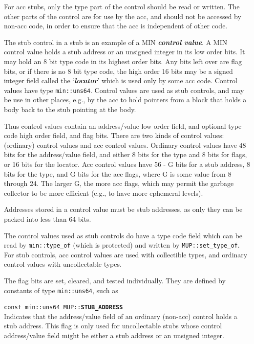 \documentclass[12pt]{article}
\makeatletter
\newcommand{\key}[1]{{\bf \em #1}\index{#1}}
\newcommand{\mkey}[2]{{\bf \em #1}\index{#1!#2}}
\newcommand{\ttindex}[1]{\index{#1@{\tt #1}}}
\newcommand{\MUPindex}[1]{\ttindex{MUP::#1}\ttindex{#1}}
\newenvironment{indpar}[1][0.3in]%
	{\begin{list}{}%
		     {\setlength{\itemsep}{0in}%
		      \setlength{\topsep}{0in}%
		      \setlength{\parsep}{1ex}%
		      \setlength{\labelwidth}{#1}%
		      \setlength{\leftmargin}{#1}%
		      \addtolength{\leftmargin}{\labelsep}}%
	 \item}%
	{\end{list}}
\newcommand{\LABEL}[1]{\label{#1}}
\newcommand{\MUPKEY}[1]{{\tt \bf #1}\MUPindex{#1}}
\makeatother
\begin{document}
For acc stubs, only the type part of the control should be read or
written.  The other parts of the control are for use by the
acc, and should not be accessed by non-acc code,
in order to ensure that the acc is independent of other code.

The stub control in a stub is an example of a MIN \key{control value}.
A MIN control value holds a stub address or an unsigned integer
in its low order bits.  It may hold an 8 bit type code in its highest order
bits.  Any bits left over are flag bits, or if there is no 8 bit type
code, the high order 16 bits may be a signed integer field called the
`\mkey{locator}{field of control value}'
which is used only by some acc code.  Control values have type
\verb|min::uns64|.  Control values are used as stub controls, and
may be use in other places, e.g., by the acc to hold pointers from
a block that holds a body back to the stub pointing at the body.

Thus control values contain an address/value low order field, and optional
type code high order field, and flag bits.  There are two kinds of
control values: (ordinary) control values and acc control values.
Ordinary control values
have 48 bits for the address/value field, and either 8 bits for the type
and 8 bits for flags, or 16 bits for the locator.
Acc control values have 56 - G bits for a stub address, 8 bits
for the type, and G bits for the acc flags, where G is some value from 8
through 24.  The larger G, the more acc flags, which may permit the
garbage collector to be more efficient (e.g., to have more ephemeral
levels).

Addresses stored in a control value must be stub addresses, as only they
can be packed into less than 64 bits.

The control values used as stub controls do have a type code field which
can be read by \verb|min::type_of| (which is protected) and
written by \verb|MUP::set_type_of|.  For stub controls,
acc control values are used with
collectible types, and ordinary control values with
uncollectable types.

The flag bits are set, cleared, and tested individually.  They are
defined by constants of type \verb|min::uns64|, such as

\begin{indpar}
\begin{list}{}{}
\item[{\tt const min::uns64 MUP::}\MUPKEY{STUB\_ADDRESS}]~%
	\LABEL{MIN::STUB_ADDRESS}\\
Indicates that the address/value field of an ordinary (non-acc)
control holds a stub address.  This flag is only used for
uncollectable stubs whose control address/value field might
be either a stub address or an unsigned integer.
\end{list}
\end{indpar}
\end{document}
